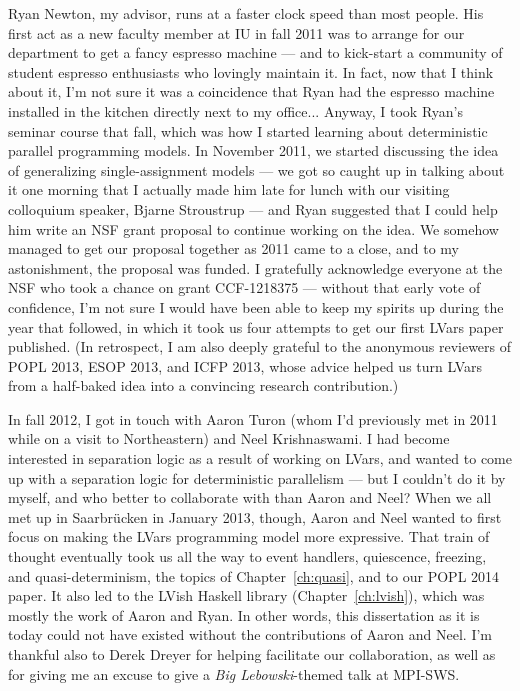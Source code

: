 Ryan Newton, my advisor, runs at a faster clock speed than most people.  His first act as a new faculty member at IU in fall 2011 was to arrange for our department to get a fancy espresso machine --- and to kick-start a community of student espresso enthusiasts who lovingly maintain it.  In fact, now that I think about it, I'm not sure it was a coincidence that Ryan had the espresso machine installed in the kitchen directly next to my office... Anyway, I took Ryan's seminar course that fall, which was how I started learning about deterministic parallel programming models.  In November 2011, we started discussing the idea of generalizing single-assignment models --- we got so caught up in talking about it one morning that I actually made him late for lunch with our visiting colloquium speaker, Bjarne Stroustrup --- and Ryan suggested that I could help him write an NSF grant proposal to continue working on the idea.  We somehow managed to get our proposal together as 2011 came to a close, and to my astonishment, the proposal was funded.  I gratefully acknowledge everyone at the NSF who took a chance on grant CCF-1218375 --- without that early vote of confidence, I'm not sure I would have been able to keep my spirits up during the year that followed, in which it took us four attempts to get our first LVars paper published.  (In retrospect, I am also deeply grateful to the anonymous reviewers of POPL 2013, ESOP 2013, and ICFP 2013, whose advice helped us turn LVars from a half-baked idea into a convincing research contribution.)

In fall 2012, I got in touch with Aaron Turon (whom I'd previously met in 2011 while on a visit to Northeastern) and Neel Krishnaswami.  I had become interested in separation logic as a result of working on LVars, and wanted to come up with a separation logic for deterministic parallelism --- but I couldn't do it by myself, and who better to collaborate with than Aaron and Neel?  When we all met up in Saarbr{\"u}cken in January 2013, though, Aaron and Neel wanted to first focus on making the LVars programming model more expressive.  That train of thought eventually took us all the way to event handlers, quiescence, freezing, and quasi-determinism, the topics of Chapter~\ref{ch:quasi}, and to our POPL 2014 paper.  It also led to the LVish Haskell library (Chapter~\ref{ch:lvish}), which was mostly the work of Aaron and Ryan.  In other words, this dissertation as it is today could not have existed without the contributions of Aaron and Neel.  I'm thankful also to Derek Dreyer for helping facilitate our collaboration, as well as for giving me an excuse to give a \emph{Big Lebowski}-themed talk at MPI-SWS.

